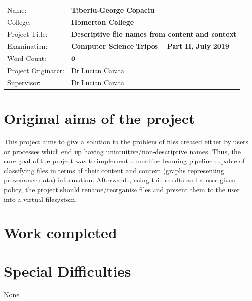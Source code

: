 \documentclass[12pt,a4paper,oneside]{report}
\begin{document}
{\large
  \begin{tabular}{ll}
    Name:               & \bf Tiberiu-George Copaciu                          \\
    College:            & \bf Homerton College                                \\
    Project Title:      & \bf Descriptive file names from content and context \\
    Examination:        & \bf Computer Science Tripos -- Part II, July 2019   \\
    Word Count:         & \bf $\mathbf{0}$\footnotemark[1]                    \\
    Project Originator: & Dr Lucian Carata                                    \\
    Supervisor:         & Dr Lucian Carata                                    \\
  \end{tabular}
}


\section*{Original aims of the project}

This project aims to give a solution to the problem of files created either by users or processes which end up having unintuitive/non-descriptive names. Thus, the core goal of the project was to implement a machine learning pipeline capable of classifying files in terms of their content and context (graphs representing provenance data) information. Afterwards, using this results and a user-given policy, the project should rename/reorganise files and present them to the user into a virtual filesystem.

\section*{Work completed}

\section*{Special Difficulties}
None.


\newpage
\tableofcontents
\listoffigures
\listoftables
\newpage







\appendix
% 


\nocite{pnn, polonium, pnn-parallel, sigmoidal, nonlinearities, DBLP:journals/corr/LuongPM15, 7266837, 2017arXiv171010903V, 279181, DBLP:journals/corr/KingmaB14, DBLP:journals/corr/VaswaniSPUJGKP17, REST-general, chollet2015keras, DBLP:journals/corr/IoffeS15, Rutkowski2004}
\end{document}

